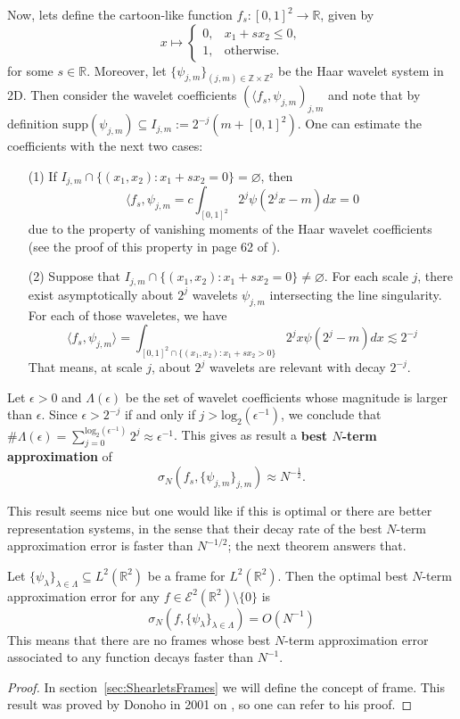 Now, lets define the cartoon-like function $f_s:[0,1]^2\longrightarrow\mathbb{R}$, given by
$$
x\mapsto\begin{cases} 0, & x_1+sx_2\leq 0,\\ 1, & \text{otherwise.}\end{cases}
$$
for some $s\in\mathbb{R}$. Moreover, let $\{\psi_{j,m}\}_{(j,m)\in\mathbb{Z}\times\mathbb{Z}^2}$ be the Haar wavelet system in 2D. Then consider the wavelet coefficients $(\langle f_s,\psi_{j,m})_{j,m}$ and note that by definition $\text{supp}(\psi_{j,m})\subseteq I_{j,m}:=2^{-j}(m+[0,1]^2)$. One can estimate the coefficients with the next two cases:
\begin{enumerate}
\item[(1)] If $I_{j,m}\cap \{ (x_1,x_2): x_1+sx_2=0\}=\varnothing$, then
$$
\langle f_s,\psi_{j,m}=c\int_{[0,1]^2}2^j\psi(2^jx-m)dx=0
$$
due to the property of vanishing moments of the Haar wavelet coefficients (see the proof of this property in page 62 of \cite{Gitta-notes}).

\item[(2)] Suppose that $I_{j,m}\cap \{(x_1,x_2):x_1+sx_2=0\}\neq \varnothing$. For each scale $j$, there exist asymptotically about $2^j$ wavelets $\psi_{j,m}$ intersecting the line singularity. For each of those waveletes, we have 
$$
\langle f_s,\psi_{j,m}\rangle = \int_{[0,1]^2\cap \{(x_1,x_2):x_1+sx_2>0\}} 2^jx\psi(2^j-m)dx\lesssim 2^{-j}
$$
That means, at scale $j$, about $2^j$ wavelets are relevant with decay $2^{-j}$.
\end{enumerate}

Let $\epsilon>0$ and $\Lambda(\epsilon)$ be the set of wavelet coefficients whose magnitude is larger than $\epsilon$. Since $\epsilon >2^{-j}$ if and only if $j>\text{log}_2(\epsilon^{-1})$, we conclude that $\#\Lambda(\epsilon)=\sum_{j=0}^{\text{log}_2(\epsilon^{-1})}2^j\approx \epsilon^{-1}$. This gives as result a \textbf{best $N$-term approximation} of
$$
\sigma_N(f_s,\{\psi_{j,m}\}_{j,m})\approx N^{-\frac{1}{2}}.
$$

This result seems nice but one would like if this is optimal or there are better representation systems, in the sense that their decay rate of the best $N$-term approximation error is faster than $N^{-1/2}$; the next theorem answers that.

\bigskip

\begin{thm}
\label{C3S2T1}
Let $\{\psi_{\lambda}\}_{\lambda\in\Lambda}\subseteq L^2(\mathbb{R}^2)$ be a frame for $L^2(\mathbb{R}^2)$. Then the optimal best $N$-term approximation error for any $f\in\mathcal{E}^2(\mathbb{R}^2)\setminus\{0\}$ is
$$
\sigma_N(f,\{\psi_{\lambda}\}_{\lambda\in\Lambda})=O(N^{-1})
$$
This means that there are no frames whose best $N$-term approximation error associated to any function decays faster than $N^{-1}$.
\end{thm}
\begin{proof}
In section~\ref{sec:ShearletsFrames} we will define the concept of frame. This result was proved by Donoho in 2001 on \cite{DonohobestNterm}, so one can refer to his proof.
\end{proof}

